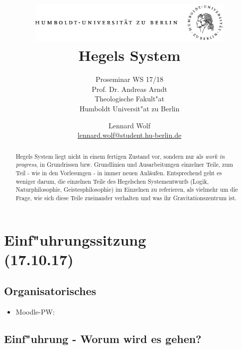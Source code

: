 \documentclass[emulatestandardclasses]{scrartcl}
\date{\vspace{-3ex}}
\begin{document}
\title{
	\includegraphics*[width=0.75\textwidth]{ErstesSem/images/hu_logo.png}\\
	\vspace{24pt}
	Hegels System}
\subtitle{Proseminar WS 17/18\\
          Prof. Dr. Andreas Arndt\\
          Theologische Fakult"at \\ 
          Humboldt Universit"at zu Berlin}
\author{Lennard Wolf\\
        \small{\href{mailto:lennard.wolf@student.hu-berlin.de}{lennard.wolf@student.hu-berlin.de}}}
\maketitle
\begin{abstract}
Hegels System liegt nicht in einem fertigen Zustand vor, sondern nur als \emph{work in progress}, in Grundrissen bzw. Grundlinien und Ausarbeitungen einzelner Teile, zum Teil - wie in den Vorlesungen - in immer neuen Anläufen. Entsprechend geht es weniger darum, die einzelnen Teile des Hegelschen Systementwurfs (Logik, Naturphilosophie, Geistesphilosophie) im Einzelnen zu referieren, als vielmehr um die Frage, wie sich diese Teile zueinander verhalten und was ihr Gravitationszentrum ist.

\end{abstract}
\newpage

\tableofcontents
\listoffigures
\newpage


\section{Einf"uhrungssitzung\\(17.10.17)}

\subsection{Organisatorisches}

\begin{itemize}
  \item Moodle-PW: 
\end{itemize}

\subsection{Einf"uhrung - Worum wird es gehen?}
\end{document}
